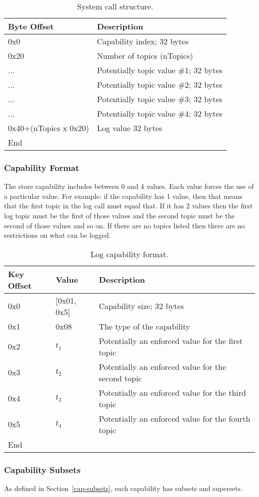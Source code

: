\documentclass[english,a4paper]{article}
\let\oldparagraph\subsubsection
\renewcommand{\subsubsection}[1]{\oldparagraph{#1}\mbox{}}
\begin{document}
\begin{table}[H]
  \caption{System call structure.}
  \centering{}%
  \begin{tabular}{l|p{}}
    \hline
    Byte Offset & Description\tabularnewline
    \hline
    \hline
    0x0 & Capability index; 32 bytes \tabularnewline
    0x20 & Number of topics (nTopics) \tabularnewline
    ... & Potentially topic value \#1; 32 bytes \tabularnewline
    ... & Potentially topic value \#2; 32 bytes \tabularnewline
    ... & Potentially topic value \#3; 32 bytes \tabularnewline
    ... & Potentially topic value \#4; 32 bytes \tabularnewline
    0x40+(nTopics x 0x20) & Log value 32 bytes \tabularnewline
    \hline
    End &  \tabularnewline
    \hline
  \end{tabular}
\end{table}

\subsubsection{Capability Format}
The store capability includes between 0 and 4 values. Each value forces the use
of a particular value. For example: if the capability has 1 value, then that
means that the first topic in the log call must equal that. If it has 2 values
then the first log topic must be the first of those values and the second topic
must be the second of those values and so on. If there are no topics listed then
there are no restrictions on what can be logged.

\begin{table}[H]
  \caption{Log capability format.}
  \centering{}%
  \begin{tabular}{l|l|p{}}
    \hline
    Key Offset & Value & Description\tabularnewline
    \hline
    \hline
    0x0 & [0x01, 0x5] & Capability size; 32 bytes \tabularnewline
    0x1 & 0x08 & The type of the capability \tabularnewline
    0x2 & $t_1$ & Potentially an enforced value for the first topic
      \tabularnewline
    0x3 & $t_2$ & Potentially an enforced value for the second topic
      \tabularnewline
    0x4 & $t_3$ & Potentially an enforced value for the third topic
      \tabularnewline
    0x5 & $t_4$ & Potentially an enforced value for the fourth topic
      \tabularnewline
    \hline
    End &  \tabularnewline
    \hline
  \end{tabular}
\end{table}

\subsubsection{Capability Subsets}
As defined in Section~\ref{cap-subsets}, each capability has subsets and
supersets.
\end{document}

